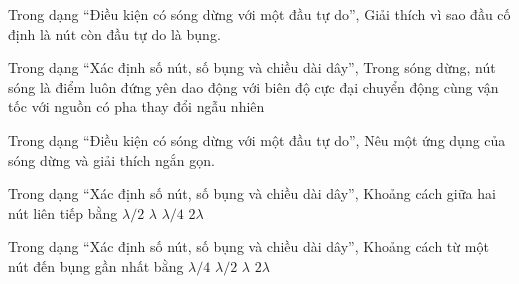 \begin{ex}
Trong dạng “Điều kiện có sóng dừng với một đầu tự do”, Giải thích vì sao đầu cố định là nút còn đầu tự do là bụng.
\choiceTF

\end{ex}

\begin{ex}
Trong dạng “Xác định số nút, số bụng và chiều dài dây”, Trong sóng dừng, nút sóng là điểm
\choice
{\True luôn đứng yên}
{dao động với biên độ cực đại}
{chuyển động cùng vận tốc với nguồn}
{có pha thay đổi ngẫu nhiên}
\end{ex}

\begin{ex}
Trong dạng “Điều kiện có sóng dừng với một đầu tự do”, Nêu một ứng dụng của sóng dừng và giải thích ngắn gọn.
\choiceTF

\end{ex}

\begin{ex}
Trong dạng “Xác định số nút, số bụng và chiều dài dây”, Khoảng cách giữa hai nút liên tiếp bằng
\choice
{\True $\lambda/2$}
{$\lambda$}
{$\lambda/4$}
{$2\lambda$}
\end{ex}

\begin{ex}
Trong dạng “Xác định số nút, số bụng và chiều dài dây”, Khoảng cách từ một nút đến bụng gần nhất bằng
\choice
{\True $\lambda/4$}
{$\lambda/2$}
{$\lambda$}
{$2\lambda$}
\end{ex}

